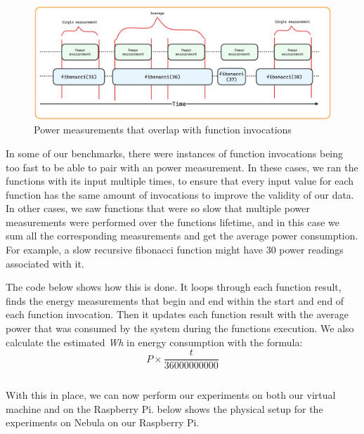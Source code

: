 \documentclass[
  table]{report}
\begin{document}
\begin{figure}[H]
\centering
  \includegraphics{assets/6-power_measurements}
  \caption{Power measurements that overlap with function invocations}
  \label{fig:power_measurement_timeline}
\end{figure}

In some of our benchmarks, there were instances of function invocations
being too fast to be able to pair with an power measurement. In these
cases, we ran the functions with its input multiple times, to ensure
that every input value for each function has the same amount of
invocations to improve the validity of our data. In other cases, we saw
functions that were so slow that multiple power measurements were
performed over the functions lifetime, and in this case we sum all the
corresponding measurements and get the average power consumption. For
example, a slow recursive fibonacci function might have 30 power
readings associated with it.

The code below shows how this is done. It loops through each function
result, finds the energy measurements that begin and end within the
start and end of each function invocation. Then it updates each function
result with the average power that was consumed by the system during the
functions execution. We also calculate the estimated \emph{Wh} in energy
consumption with the formula: \[P \times
\frac{t}{36000000000}\]

\inputminted{rust}{assets/code/pair_power_data.rs}

With this in place, we can now perform our experiments on both our
virtual machine and on the Raspberry Pi.  below
shows the physical setup for the experiments on Nebula on our Raspberry
Pi.
\end{document}
